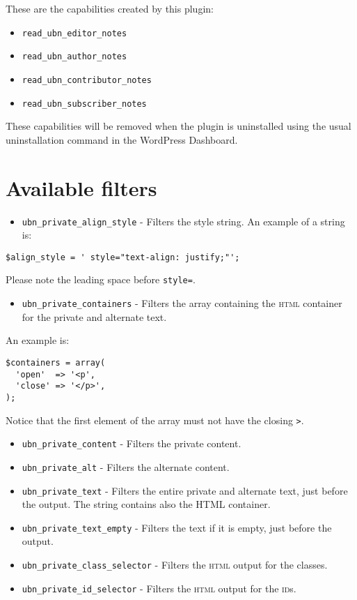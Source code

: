 \documentclass[a4paper,10pt]{article}
\begin{document}
These are the capabilities created by this plugin:

\begin{itemize}
 \item \verb+read_ubn_editor_notes+
 \item \verb+read_ubn_author_notes+
 \item \verb+read_ubn_contributor_notes+
 \item \verb+read_ubn_subscriber_notes+
\end{itemize}

These capabilities will be removed when the plugin is uninstalled using the usual uninstallation command in the WordPress Dashboard.

\section{Available filters}

\begin{itemize}
 \item \verb+ubn_private_align_style+ - Filters the style string. An example of a string is:
\end{itemize}

\begin{lstlisting}
$align_style = ' style="text-align: justify;"';
\end{lstlisting}

Please note the leading space before \verb+style=+.

\begin{itemize}
 \item \verb+ubn_private_containers+ - Filters the array containing the \textsc{html} container for the private and alternate text.
\end{itemize}

An example is:

\begin{lstlisting}
$containers = array(
  'open'  => '<p',
  'close' => '</p>',
);
\end{lstlisting}

Notice that the first element of the array must not have the closing \verb+>+.

\begin{itemize}
 \item \verb+ubn_private_content+ - Filters the private content.
 \item \verb+ubn_private_alt+ - Filters the alternate content.
 \item \verb+ubn_private_text+ - Filters the entire private and alternate text, just before the output. The string contains also the HTML container.
 \item \verb+ubn_private_text_empty+ - Filters the text if it is empty, just before the output.
 \item \verb+ubn_private_class_selector+ - Filters the \textsc{html} output for the classes.
 \item \verb+ubn_private_id_selector+ - Filters the \textsc{html} output for the \textsc{id}s.
\end{itemize}
\end{document}
